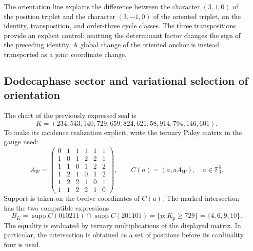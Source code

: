 The orientation line explains the difference between the character
\((3,1,0)\) of the position triplet and the character \((3,-1,0)\)
of the oriented triplet, on the identity, transposition, and
order-three cycle classes. The three transpositions provide an explicit control:
omitting the determinant factor changes the sign of the preceding identity.
A global change of the oriented anchor is instead transported as a joint
coordinate change.

\subsection{Dodecaphase sector and variational selection of orientation}

The chart of the previously expressed seal is
\begin{equation}
 K=(234,543,140,729,659,824,621,58,914,794,146,601).
 \label{ii:eq:ii-witt-K-marked}
\end{equation}
To make its incidence realization explicit, write the ternary Paley
matrix in the gauge used:
\[
 A_W=\begin{pmatrix}
 0&1&1&1&1&1\\
 1&0&1&2&2&1\\
 1&1&0&1&2&2\\
 1&2&1&0&1&2\\
 1&2&2&1&0&1\\
 1&1&2&2&1&0
 \end{pmatrix},
 \qquad C(a)=(a,aA_W),\quad a\in\mathbb F_3^6.
\]
Support is taken on the twelve coordinates of \(C(a)\). The
marked intersection has the two compatible expressions
\begin{equation}
 B_K=\operatorname{supp}C(010211)\cap\operatorname{supp}C(201101)
     =\{p:K_p\ge729\}=\{4,6,9,10\}.
 \label{ii:eq:ii-witt-B-marked}
\end{equation}
The equality is evaluated by ternary multiplications of the displayed
matrix. In particular, the intersection is obtained as a set of
positions before its cardinality four is used.

